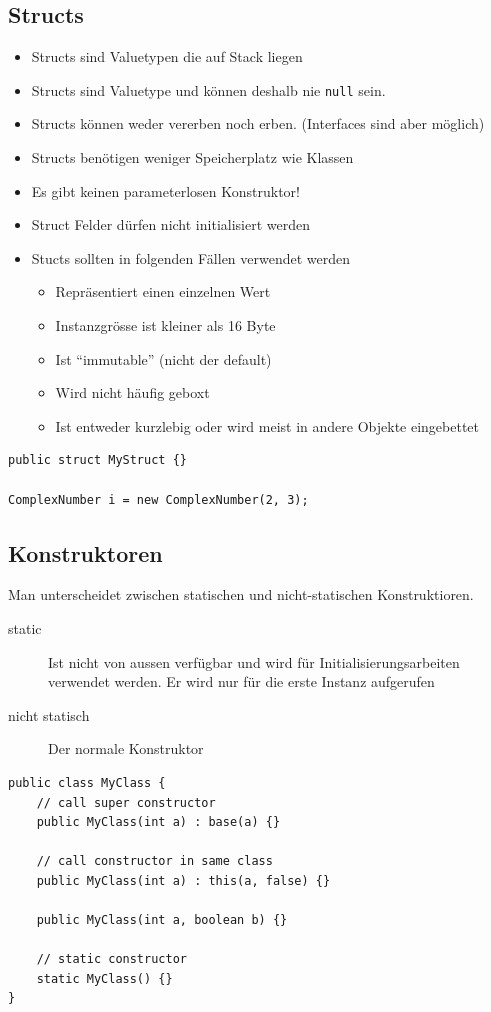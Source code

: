 \subsection{Structs}
\begin{itemize}
	\item Structs sind Valuetypen die auf Stack liegen
	\item Structs sind Valuetype und können deshalb nie \lstinline[]|null| sein.
	\item Structs können weder vererben noch erben. (Interfaces sind aber möglich)
	\item Structs benötigen weniger Speicherplatz wie Klassen
	\item Es gibt keinen parameterlosen Konstruktor!
	\item Struct Felder dürfen nicht initialisiert werden
	\item Stucts sollten in folgenden Fällen verwendet werden
	\begin{itemize}
		\item Repräsentiert einen einzelnen Wert
		\item Instanzgrösse ist kleiner als 16 Byte
		\item Ist “immutable” (nicht der default)
		\item Wird nicht häufig geboxt
		\item Ist entweder kurzlebig oder wird meist in andere Objekte eingebettet
	\end{itemize}
\end{itemize}
\begin{lstlisting}
public struct MyStruct {}

ComplexNumber i = new ComplexNumber(2, 3);
\end{lstlisting}

\subsection{Konstruktoren}
Man unterscheidet zwischen statischen und nicht-statischen Konstruktioren.
\begin{description}
	\item[static] Ist nicht von aussen verfügbar und wird für Initialisierungsarbeiten verwendet werden. Er wird nur für die erste Instanz aufgerufen
	\item[nicht statisch] Der normale Konstruktor
\end{description}
\begin{lstlisting}
public class MyClass {
	// call super constructor
	public MyClass(int a) : base(a) {}

	// call constructor in same class
	public MyClass(int a) : this(a, false) {}
	
	public MyClass(int a, boolean b) {}
	
	// static constructor
	static MyClass() {}
}
\end{lstlisting}

